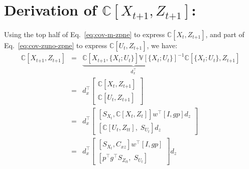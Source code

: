 \documentclass[9pt]{article}
\newcommand{\V}{{\mathbb V}}
\newcommand{\Cov}{{\mathbb C}}
\newcommand{\now}[1]{#1_t}                  %
\newcommand{\new}[1]{#1_{t\mathord{+}1}}    %
\newcommand{\pno}[1]{#1_{t}}  %
\newcommand{\uno}[1]{#1_{tt}}              %
\newcommand{\pne}[1]{#1_{t\mathord{+}1}}   %
\newcommand{\inv}{^{-1}}
\newcommand{\nnn}{\nonumber \\}
\newcommand{\nn}{\nonumber}
\begin{document}
\section{Derivation of $\Cov[\new{X},\pne{Z}]$:}

Using the top half of Eq.~\ref{eq:cov-m-zpne} to express $\Cov[\now{X},\pne{Z}]$,
and part of Eq.~\ref{eq:cov-zuno-zpne} to express $\Cov[\now{U},\pne{Z}]$,
we have:
\begin{eqnarray}
\Cov[\new{X},\pne{Z}]
 &=& \underbrace{\Cov[\new{X},\{\now{X};\now{U}\}]\V[\{\now{X};\now{U}\}]\inv}_{d_x^\top}
     \Cov[\{\now{X};\now{U}\},\pne{Z}] \nnn
 &=& d_x^\top \begin{bmatrix} \Cov[\now{X},\pne{Z}] \\ \Cov[\now{U},\pne{Z}]\end{bmatrix} \nnn
 &=& d_x^\top \begin{bmatrix} [S_{\now{X}},\Cov[\now{X},\pno{Z}]] w^\top [ I , gp ] d_z \\
                              [\Cov[\now{U},\uno{Z}],\;S_{\now{U}}]d_z\end{bmatrix} \nnn
 &=& d_x^\top \begin{bmatrix} [S_{\now{X}},C_{xz}] w^\top [ I , gp ] \\
                              [p^\top g^\top S_{\uno{Z}},\;S_{\now{U}}] \end{bmatrix} d_z \nn
\end{eqnarray}

\end{document}
